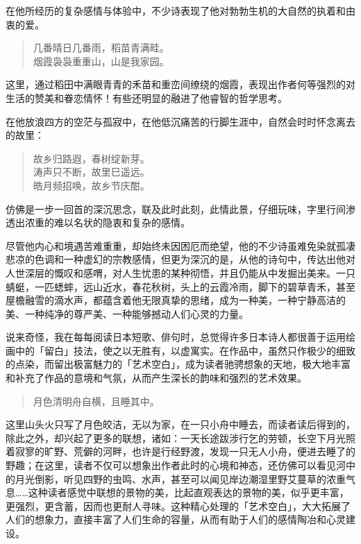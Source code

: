 {  在他所经历的复杂感情与体验中，不少诗表现了他对勃勃生机的大自然的执着和由衷的爱。

  \begin{quote}
      几番晴日几番雨，稻苗青满畦。\\
      烟霞袅袅重重山，山是我家园。
  \end{quote}

  这里，通过稻田中满眼青青的禾苗和重峦间缭绕的烟霞，表现出作者何等强烈的对生活的赞美和眷恋情怀！有些还明显的融进了他睿智的哲学思考。

  在他放浪四方的空茫与孤寂中，在他低沉痛苦的行脚生涯中，自然会时时怀念离去的故里：

  \begin{quote}
      故乡归路遐，春树绽新芽。\\
      涛声只不断，故里巳遥远。\\
      皓月频招唤，故乡节庆酣。
  \end{quote}

  仿佛是一步一回首的深沉思念，联及此时此刻，此情此景，仔细玩味，字里行间渗透出浓重的难以名状的隐衷和复杂的感情。

  尽管他内心和境遇苦难重重，却始终未因困厄而绝望，他的不少诗虽难免染就孤凄悲凉的色调和一种虚幻的宗教感情，但更为深沉的是，从他的诗句中，传达出他对人世深层的慨叹和感喟，对人生忧患的某种彻悟，并且仍能从中发掘出美来。一只蜻蜓，一匹蟋蟀，远山近水，春花秋树，头上的云霞冷雨，脚下的碧草青禾，甚至屋檐融雪的滴水声，都蕴含着他无限真挚的思绪，成为一种美，一种宁静高洁的美、一种纯净的尊严美、一种能够撼动人们心灵的力量。

  说来奇怪，我在每每阅读日本短歌、俳句时，总觉得许多日本诗人都很善于运用绘画中的「留白」技法，使之以无胜有，以虚寓实。在作品中，虽然只作极少的细致的点染，而留出极富魅力的「艺术空白」，成为读者驰骋想象的天地，极大地丰富和补充了作品的意境和气氛，从而产生深长的韵味和强烈的艺术效果。

  \begin{quote}
      月色清明舟自横，且睡其中。
  \end{quote}

  这里山头火只写了月色皎洁，无以为家，在一只小舟中睡去，而读者读后得到的，除此之外，却兴起了更多的联想，诸如：一天长途跋涉行乞的劳顿，长空下月光照着寂寥的旷野、荒僻的河畔，也许是行经野渡，发现一只无人小舟，便进去睡了的野趣；在这里，读者不仅可以想象出作者此时的心境和神态，还仿佛可以看见河中的月光倒影，听见四野的虫鸣、水声，甚至可以闻见岸边潮湿里野艾蔓草的浓重气息……这种读者感觉中联想的景物的美，比起直观表达的景物的美，似乎更丰富，更强烈，更含蓄，因而也更耐人寻味。这种精心处理的「艺术空白」，大大拓展了人们的想象力，直接丰富了人们生命的容量，从而有助于人们的感情陶冶和心灵建设。

}
